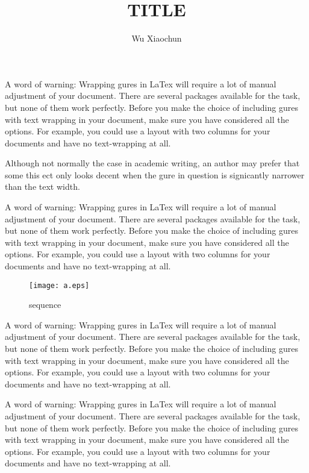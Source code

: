 \documentclass[12pt,a4paper,onecolumn]{article}
\title{TITLE}
\author{Wu Xiaochun}
\date{}
\begin{document}
A word of warning: Wrapping gures in LaTex will require a lot of manual adjustment
of your document. There are several packages available for the task, but
none of them work perfectly. Before you make the choice of including gures with
text wrapping in your document, make sure you have considered all the options. For
example, you could use a layout with two columns for your documents and have no
text-wrapping at all.


Although not normally the case in academic writing, an author may prefer that some
this ect only looks decent when the gure in question is signicantly narrower
than the text width.

A word of warning: Wrapping gures in LaTex will require a lot of manual adjustment
of your document. There are several packages available for the task, but
none of them work perfectly. Before you make the choice of including gures with
text wrapping in your document, make sure you have considered all the options. For
example, you could use a layout with two columns for your documents and have no
text-wrapping at all.
\begin{wrapfigure}{l}{0.5\textwidth}
\begin{center}
\texttt{[image: a.eps]}
\end{center}
\caption{sequence}
\end{wrapfigure}
A word of warning: Wrapping gures in LaTex will require a lot of manual adjustment
of your document. There are several packages available for the task, but
none of them work perfectly. Before you make the choice of including gures with
text wrapping in your document, make sure you have considered all the options. For
example, you could use a layout with two columns for your documents and have no
text-wrapping at all.

A word of warning: Wrapping gures in LaTex will require a lot of manual adjustment
of your document. There are several packages available for the task, but
none of them work perfectly. Before you make the choice of including gures with
text wrapping in your document, make sure you have considered all the options. For
example, you could use a layout with two columns for your documents and have no
text-wrapping at all.
\end{document}
